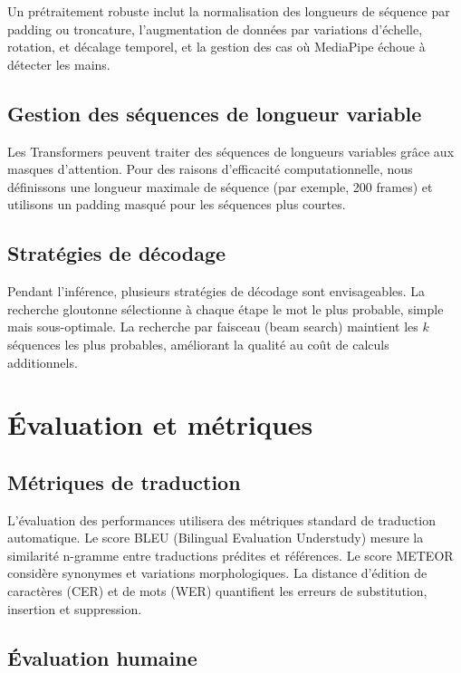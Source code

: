 \documentclass[twocolumn]{el-author}
\begin{document}
Un prétraitement robuste inclut la normalisation des longueurs de séquence par padding ou troncature, l'augmentation de données par variations d'échelle, rotation, et décalage temporel, et la gestion des cas où MediaPipe échoue à détecter les mains.

\subsection{Gestion des séquences de longueur variable}

Les Transformers peuvent traiter des séquences de longueurs variables grâce aux masques d'attention. Pour des raisons d'efficacité computationnelle, nous définissons une longueur maximale de séquence (par exemple, 200 frames) et utilisons un padding masqué pour les séquences plus courtes.

\subsection{Stratégies de décodage}

Pendant l'inférence, plusieurs stratégies de décodage sont envisageables. La recherche gloutonne sélectionne à chaque étape le mot le plus probable, simple mais sous-optimale. La recherche par faisceau (beam search) maintient les $k$ séquences les plus probables, améliorant la qualité au coût de calculs additionnels.

\section{Évaluation et métriques}

\subsection{Métriques de traduction}

L'évaluation des performances utilisera des métriques standard de traduction automatique. Le score BLEU (Bilingual Evaluation Understudy) mesure la similarité n-gramme entre traductions prédites et références. Le score METEOR considère synonymes et variations morphologiques. La distance d'édition de caractères (CER) et de mots (WER) quantifient les erreurs de substitution, insertion et suppression.

\subsection{Évaluation humaine}
\end{document}
